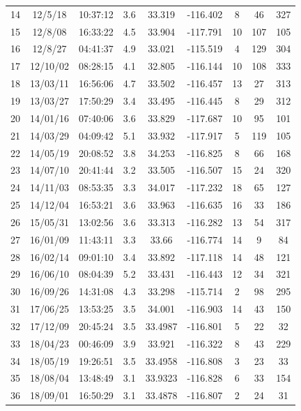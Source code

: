 \begin{table}[!ht]
{\begin{tabular}{@{}ccccccccc@{}}
      14                       & 12/5/18  & 10:37:12 & 3.6 & 33.319  & -116.402 & 8  & 46  & 327 \\
      15                       & 12/8/08  & 16:33:22 & 4.5 & 33.904  & -117.791 & 10 & 107 & 105 \\
      16                       & 12/8/27  & 04:41:37 & 4.9 & 33.021  & -115.519 & 4  & 129 & 304 \\
      17                       & 12/10/02 & 08:28:15 & 4.1 & 32.805  & -116.144 & 10 & 108 & 333 \\
      18                       & 13/03/11 & 16:56:06 & 4.7 & 33.502  & -116.457 & 13 & 27  & 313 \\
      19                       & 13/03/27 & 17:50:29 & 3.4 & 33.495  & -116.445 & 8  & 29  & 312 \\
      20                       & 14/01/16 & 07:40:06 & 3.6 & 33.829  & -117.687 & 10 & 95  & 101 \\
      21                       & 14/03/29 & 04:09:42 & 5.1 & 33.932  & -117.917 & 5  & 119 & 105 \\
      22                       & 14/05/19 & 20:08:52 & 3.8 & 34.253  & -116.825 & 8  & 66  & 168 \\
      23                       & 14/07/10 & 20:41:44 & 3.2 & 33.505  & -116.507 & 15 & 24  & 320 \\
      24                       & 14/11/03 & 08:53:35 & 3.3 & 34.017  & -117.232 & 18 & 65  & 127 \\
      25                       & 14/12/04 & 16:53:21 & 3.6 & 33.963  & -116.635 & 16 & 33  & 186 \\
      26                       & 15/05/31 & 13:02:56 & 3.6 & 33.313  & -116.282 & 13 & 54  & 317 \\
      27                       & 16/01/09 & 11:43:11 & 3.3 & 33.66   & -116.774 & 14 & 9   & 84  \\
      28                       & 16/02/14 & 09:01:10 & 3.4 & 33.892  & -117.118 & 14 & 48  & 121 \\
      29                       & 16/06/10 & 08:04:39 & 5.2 & 33.431  & -116.443 & 12 & 34  & 321 \\
      30                       & 16/09/26 & 14:31:08 & 4.3 & 33.298  & -115.714 & 2  & 98  & 295 \\
      31                       & 17/06/25 & 13:53:25 & 3.5 & 34.001  & -116.903 & 14 & 43  & 150 \\
      32                       & 17/12/09 & 20:45:24 & 3.5 & 33.4987 & -116.801 & 5  & 22  & 32  \\
      33                       & 18/04/23 & 00:46:09 & 3.9 & 33.921  & -116.322 & 8  & 43  & 229 \\
      34                       & 18/05/19 & 19:26:51 & 3.5 & 33.4958 & -116.808 & 3  & 23  & 33  \\
      35                       & 18/08/04 & 13:48:49 & 3.1 & 33.9323 & -116.828 & 6  & 33  & 154 \\
      36                       & 18/09/01 & 16:50:29 & 3.1 & 33.4878 & -116.807 & 2  & 24  & 31  \\ \bottomrule
    \end{tabular}}
\end{table}
